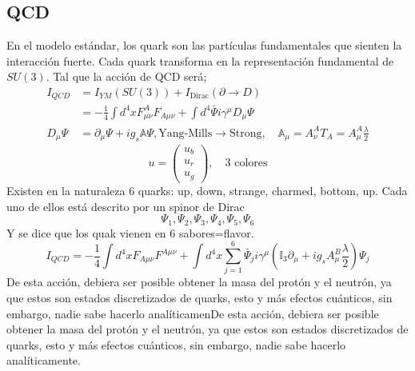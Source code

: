 \documentclass[../main.tex]{subfiles}
\begin{document}
 \subsection{QCD}
 En el modelo estándar, los quark son las partículas fundamentales que sienten la interacción fuerte. Cada quark transforma en la representación fundamental de $SU(3)$. Tal que la acción de QCD será;
 \begin{align*}
   I_{QCD} & = I_{YM} (SU(3)) + I_{\text{Dirac}} \left( \partial\rightarrow D \right) \\
   &  = -\frac{1}{4} \int d^4x F_{\mu\nu}^A F_{A\mu\nu} + \int d^4 \bar{\Psi} i \gamma^\mu D_\mu \Psi \\
   D_\mu \Psi& = \partial_\mu \Psi + ig_{s} \mathbb{A} \Psi, \text{Yang-Mills}\rightarrow \text{Strong}, \quad \mathbb{A_\mu } = A^A_\nu T_A = A^A_\mu \frac{\lambda}{2}
  \end{align*}
  \begin{equation}
    u = \begin{pmatrix}
      u_b \\ u_r \\ u_g
    \end{pmatrix}, \quad \text{3 colores}
   \end{equation}
  Existen en la naturaleza 6 quarks: up, down, strange, charmed, bottom, up. Cada uno de ellos está descrito por un spinor de Dirac
  \begin{equation}
    \Psi_1 , \Psi_2, \Psi_3, \Psi_4, \Psi_5, \Psi_6
   \end{equation}
   Y se dice que los quak vienen en 6 sabores=flavor.
   \begin{equation}
     I_{QCD} = -\frac{1}{4} \int d^4x F_{A\mu\nu}F^{A\mu\nu} + \int d^4x \sum^6_{j=1} \bar{\Psi}_j i \gamma^\mu \left( \mathbb{I}_3\partial_\mu + ig_s A_\mu^B \frac{\lambda}{2} \right)\Psi_j
    \end{equation}
De esta acción, debiera ser posible obtener la masa del protón y el neutrón, ya que estos son estados discretizados de quarks, esto y más efectos cuánticos, sin embargo, nadie sabe hacerlo analíticamenDe esta acción, debiera ser posible obtener la masa del protón y el neutrón, ya que estos son estados discretizados de quarks, esto y más efectos cuánticos, sin embargo, nadie sabe hacerlo analíticamente.
\end{document}
